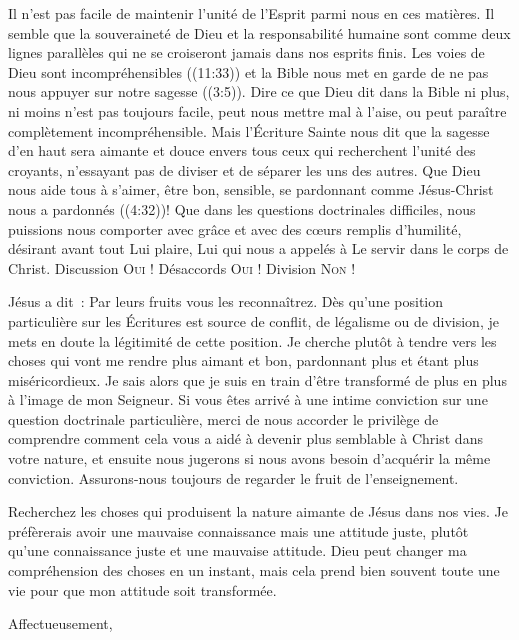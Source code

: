 \begin{specialpar}{}
Il n'est pas facile de maintenir l'unité de l'Esprit parmi nous en ces matières.
 Il semble que la souveraineté de Dieu et la responsabilité humaine
 sont comme deux lignes parallèles qui ne se croiseront jamais dans nos esprits finis.
 Les voies de Dieu sont \og incompréhensibles \fg{} ((11:33))
 et la Bible nous met en garde de \og ne pas nous appuyer sur notre sagesse \fg{}
 ((3:5)).
 Dire ce que Dieu dit dans la Bible \ocadr ni plus, ni moins \fcadr{} n'est pas toujours facile,
 peut nous mettre mal à l'aise, ou peut paraître complètement incompréhensible.
 Mais l'Écriture Sainte nous dit que la sagesse d'en haut sera aimante
 et douce envers tous ceux qui recherchent l'unité des croyants,
 n'essayant pas de diviser et de séparer les uns des autres.
 Que Dieu nous aide tous à s'aimer, être bon, sensible, se pardonnant comme Jésus-Christ
 nous a pardonnés ((4:32))!
 Que dans les questions doctrinales difficiles, nous puissions nous comporter avec grâce
 et avec des cœurs remplis d'humilité, désirant avant tout Lui plaire,
 Lui qui nous a appelés à Le servir dans le corps de Christ.
 Discussion \ocadr \textsc{Oui} !
 Désaccords \ocadr \textsc{Oui} !
 Division \ocadr \textsc{Non} !
\end{specialpar}

Jésus a dit~: \og Par leurs fruits vous les reconnaîtrez. \fg{}
 Dès qu'une position particulière sur les Écritures
 est source de conflit, de légalisme ou de division,
 je mets en doute la légitimité de cette position.
 Je cherche plutôt à tendre vers les choses qui vont me rendre plus aimant et bon,
 pardonnant plus et étant plus miséricordieux.
 Je sais alors que je suis en train d'être transformé de plus
 en plus à l'image de mon Seigneur.
Si vous êtes arrivé à une intime conviction sur une question doctrinale particulière,
 merci de nous accorder le privilège de comprendre comment cela vous a aidé à devenir
 plus semblable à Christ dans votre nature, et ensuite nous jugerons
 si nous avons besoin d'acquérir la même conviction.
 Assurons-nous toujours de regarder le fruit de l'enseignement.

\begin{specialpar}{}
Recherchez les choses qui produisent la nature aimante de Jésus dans nos vies.
 \pocketlinebreak
 Je préfèrerais avoir une mauvaise connaissance mais une attitude juste,
 plutôt qu'une connaissance juste et une mauvaise attitude.
 Dieu peut changer ma compréhension des choses en un instant,
 mais cela prend bien souvent toute une vie pour que mon attitude
 soit transformée.
\end{specialpar}

Affectueusement,

\signature{Chuck Smith}


\closechapter

